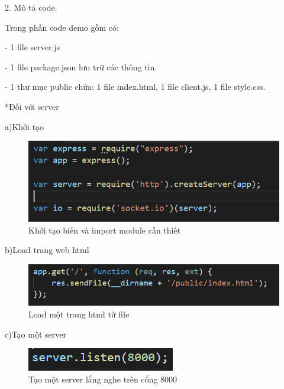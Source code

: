 \documentclass{report}
\begin{document}
\newpage
\bigskip
\changefontsizes{14pt}
\setlength{\parindent}{0cm}
2. Mô tả code.

\setlength{\parindent}{1cm}
Trong phần code demo gồm có:

- 1 file server.js

- 1 file package.json lưu trữ các thông tin.

- 1 thư mục public chứa: 1 file index.html, 1 file client.js, 1 file style.css.

\setlength{\parindent}{0cm}
*Đối với server

a)Khởi tạo

\begin{center}
    \begin{figure}[htp]
    \begin{center}
     \includegraphics[scale=1.2]{initi.png}
    \end{center}
    \caption{Khởi tạo biến và import module cần thiết}
    \label{refhinh1}
    \end{figure}
\end{center}

b)Load trang web html

\begin{center}
    \begin{figure}[htp]
    \begin{center}
     \includegraphics[scale=1.2]{load.png}
    \end{center}
    \caption{Load một trang html từ file}
    \label{refhinh1}
    \end{figure}
\end{center}

c)Tạo một server

\begin{center}
    \begin{figure}[htp]
    \begin{center}
     \includegraphics[scale=1.2]{server.png}
    \end{center}
    \caption{Tạo một server lắng nghe trên cổng 8000}
    \label{refhinh1}
    \end{figure}
\end{center}
\end{document}
